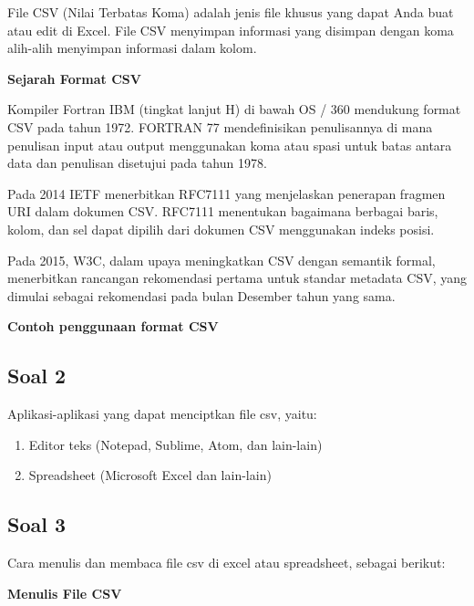 File CSV (Nilai Terbatas Koma) adalah jenis file khusus yang dapat Anda buat atau edit di Excel. File CSV menyimpan informasi yang disimpan dengan koma alih-alih menyimpan informasi dalam kolom.

\textbf{Sejarah Format CSV}

Kompiler Fortran IBM (tingkat lanjut H) di bawah OS / 360 mendukung format CSV pada tahun 1972. FORTRAN 77 mendefinisikan penulisannya di mana penulisan input atau output menggunakan koma atau spasi untuk batas antara data dan penulisan disetujui pada tahun 1978.

Pada 2014 IETF menerbitkan RFC7111 yang menjelaskan penerapan fragmen URI dalam dokumen CSV. RFC7111 menentukan bagaimana berbagai baris, kolom, dan sel dapat dipilih dari dokumen CSV menggunakan indeks posisi.

Pada 2015, W3C, dalam upaya meningkatkan CSV dengan semantik formal, menerbitkan rancangan rekomendasi pertama untuk standar metadata CSV, yang dimulai sebagai rekomendasi pada bulan Desember tahun yang sama.

\textbf{Contoh penggunaan format CSV}



\subsection{Soal 2}
Aplikasi-aplikasi yang dapat menciptkan file csv, yaitu:

\begin{enumerate}
	\item Editor teks (Notepad, Sublime, Atom, dan lain-lain)
	\item Spreadsheet (Microsoft Excel dan lain-lain)
\end{enumerate}

\subsection{Soal 3}
Cara menulis dan membaca file csv di excel atau spreadsheet, sebagai berikut:

\textbf{Menulis File CSV}

